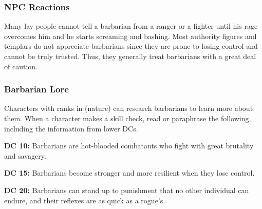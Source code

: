 \subsubsection{NPC Reactions}

Many lay people cannot tell a barbarian from a ranger or a fighter until his rage overcomes him and he starts screaming and bashing. Most authority figures and templars do not appreciate barbarians since they are prone to losing control and cannot be truly trusted. Thus, they generally treat barbarians with a great deal of caution.

\subsubsection{Barbarian Lore}

Characters with ranks in  (nature) can research barbarians to learn more about them. When a character makes a skill check, read or paraphrase the following, including the information from lower DCs.

\textbf{DC 10:} Barbarians are hot-blooded combatants who fight with great brutality and savagery.

\textbf{DC 15:} Barbarians become stronger and more resilient when they lose control.

\textbf{DC 20:} Barbarians can stand up to punishment that no other individual can endure, and their reflexes are as quick as a rogue's.